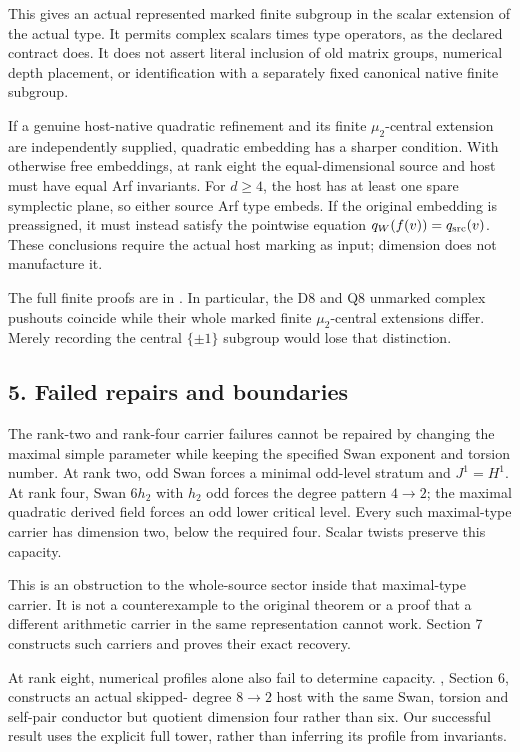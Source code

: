 This gives an actual represented marked finite subgroup in the scalar
extension of the actual type. It permits complex scalars times type
operators, as the declared contract does. It does not assert literal
inclusion of old matrix groups, numerical depth placement, or
identification with a separately fixed canonical native finite subgroup.

If a genuine host-native quadratic refinement and its finite
\(\mu_2\)-central extension are independently supplied, quadratic
embedding has a sharper condition. With otherwise free embeddings, at
rank eight the equal-dimensional source and host must have equal Arf
invariants. For \(d\ge4\), the host has at least one spare symplectic
plane, so either source Arf type embeds. If the original embedding is
preassigned, it must instead satisfy the pointwise equation
\(q_W(f(v))=q_{\rm src}(v)\). These conclusions require the actual host
marking as input; dimension does not manufacture it.

The full finite proofs are in .
In particular, the D8 and Q8 unmarked complex pushouts coincide while
their whole marked finite \(\mu_2\)-central extensions differ. Merely
recording the central \(\{\pm1\}\) subgroup would lose that distinction.

\hypertarget{dyadic_synthesis-failed-repairs-and-boundaries}{%
\subsection{5. Failed repairs and
boundaries}\label{dyadic_synthesis-failed-repairs-and-boundaries}}

The rank-two and rank-four carrier failures cannot be repaired by
changing the maximal simple parameter while keeping the specified Swan
exponent and torsion number. At rank two, odd Swan forces a minimal
odd-level stratum and \(J^1=H^1\). At rank four, Swan \(6h_2\) with
\(h_2\) odd forces the degree pattern \(4\to2\); the maximal quadratic
derived field forces an odd lower critical level. Every such
maximal-type carrier has dimension two, below the required four. Scalar
twists preserve this capacity.

This is an obstruction to the whole-source sector inside that
maximal-type carrier. It is not a counterexample to the original theorem
or a proof that a different arithmetic carrier in the same
representation cannot work. Section 7 constructs such carriers and
proves their exact recovery.

At rank eight, numerical profiles alone also fail to determine capacity.
, Section 6, constructs an
actual skipped- degree \(8\to2\) host with the same Swan, torsion and
self-pair conductor but quotient dimension four rather than six. Our
successful result uses the explicit full tower, rather than inferring
its profile from invariants.

